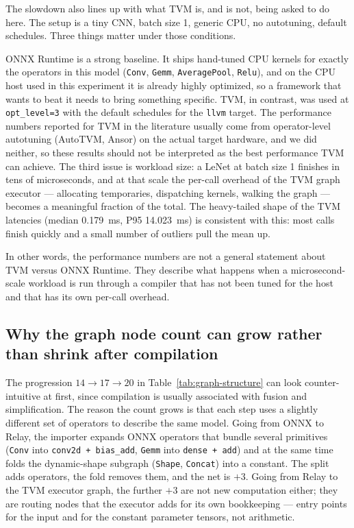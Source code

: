 \documentclass[fleqn,10pt]{olplainarticle}
\begin{document}
The slowdown also lines up with what TVM is, and is not, being asked to do here. The setup is a tiny CNN, batch size 1, generic CPU, no autotuning, default schedules. Three things matter under those conditions.

ONNX Runtime is a strong baseline. It ships hand-tuned CPU kernels for exactly the operators in this model (\texttt{Conv}, \texttt{Gemm}, \texttt{AveragePool}, \texttt{Relu}), and on the CPU host used in this experiment it is already highly optimized, so a framework that wants to beat it needs to bring something specific. TVM, in contrast, was used at \texttt{opt\_level=3} with the default schedules for the \texttt{llvm} target. The performance numbers reported for TVM in the literature usually come from operator-level autotuning (AutoTVM, Ansor) \cite{zheng2020ansor} on the actual target hardware, and we did neither, so these results should not be interpreted as the best performance TVM can achieve. The third issue is workload size: a LeNet at batch size 1 finishes in tens of microseconds, and at that scale the per-call overhead of the TVM graph executor --- allocating temporaries, dispatching kernels, walking the graph --- becomes a meaningful fraction of the total. The heavy-tailed shape of the TVM latencies (median 0.179~ms, P95 14.023~ms) is consistent with this: most calls finish quickly and a small number of outliers pull the mean up.

In other words, the performance numbers are not a general statement about TVM versus ONNX Runtime. They describe what happens when a microsecond-scale workload is run through a compiler that has not been tuned for the host and that has its own per-call overhead.

\subsection{Why the graph node count can grow rather than shrink after compilation}

The progression $14 \rightarrow 17 \rightarrow 20$ in Table~\ref{tab:graph-structure} can look counter-intuitive at first, since compilation is usually associated with fusion and simplification. The reason the count grows is that each step uses a slightly different set of operators to describe the same model. Going from ONNX to Relay, the importer expands ONNX operators that bundle several primitives (\texttt{Conv} into \texttt{conv2d + bias\_add}, \texttt{Gemm} into \texttt{dense + add}) and at the same time folds the dynamic-shape subgraph (\texttt{Shape}, \texttt{Concat}) into a constant. The split adds operators, the fold removes them, and the net is $+3$. Going from Relay to the TVM executor graph, the further $+3$ are not new computation either; they are routing nodes that the executor adds for its own bookkeeping --- entry points for the input and for the constant parameter tensors, not arithmetic.
\end{document}
